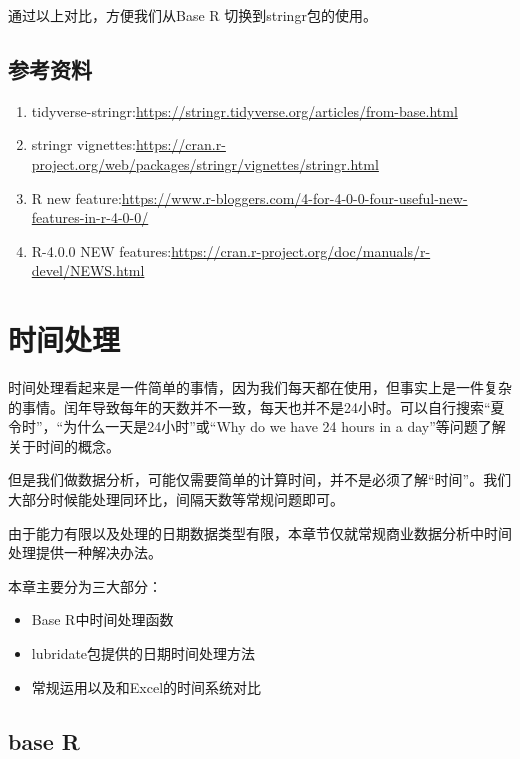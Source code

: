 \documentclass[
]{book}
\providecommand{\tightlist}{%
  \setlength{\itemsep}{0pt}\setlength{\parskip}{0pt}}
\begin{document}
通过以上对比，方便我们从Base R 切换到stringr包的使用。

\hypertarget{ux53c2ux8003ux8d44ux6599}{%
\section{参考资料}\label{ux53c2ux8003ux8d44ux6599}}

\begin{enumerate}
\def\labelenumi{\arabic{enumi}.}
\tightlist
\item
  tidyverse-stringr:\url{https://stringr.tidyverse.org/articles/from-base.html}
\item
  stringr vignettes:\url{https://cran.r-project.org/web/packages/stringr/vignettes/stringr.html}
\item
  R new feature:\url{https://www.r-bloggers.com/4-for-4-0-0-four-useful-new-features-in-r-4-0-0/}
\item
  R-4.0.0 NEW features:\url{https://cran.r-project.org/doc/manuals/r-devel/NEWS.html}
\end{enumerate}

\hypertarget{datetime}{%
\chapter{时间处理}\label{datetime}}

时间处理看起来是一件简单的事情，因为我们每天都在使用，但事实上是一件复杂的事情。闰年导致每年的天数并不一致，每天也并不是24小时。可以自行搜索``夏令时''，``为什么一天是24小时''或``Why do we have 24 hours in a day''等问题了解关于时间的概念。

但是我们做数据分析，可能仅需要简单的计算时间，并不是必须了解``时间''。我们大部分时候能处理同环比，间隔天数等常规问题即可。

由于能力有限以及处理的日期数据类型有限，本章节仅就常规商业数据分析中时间处理提供一种解决办法。

本章主要分为三大部分：

\begin{itemize}
\item
  Base R中时间处理函数
\item
  lubridate包提供的日期时间处理方法
\item
  常规运用以及和Excel的时间系统对比
\end{itemize}

\hypertarget{datetime:base-R}{%
\section{base R}\label{datetime:base-R}}
\end{document}
